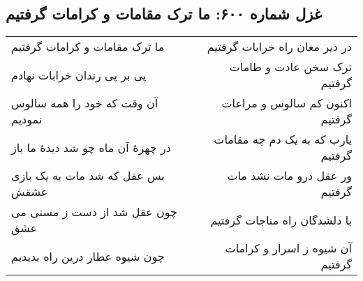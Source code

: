 \begin{center}
\section*{غزل شماره ۶۰۰: ما ترک مقامات و کرامات گرفتیم}
\label{sec:600}
\begin{longtable}{l p{0.5cm} r}
ما ترک مقامات و کرامات گرفتیم
&&
در دیر مغان راه خرابات گرفتیم
\\
پی بر پی رندان خرابات نهادم
&&
ترک سخن عادت و طامات گرفتیم
\\
آن وقت که خود را همه سالوس نمودیم
&&
اکنون کم سالوس و مراعات گرفتیم
\\
در چهرهٔ آن ماه چو شد دیدهٔ ما باز
&&
یارب که به یک دم چه مقامات گرفتیم
\\
بس عقل که شد مات به یک بازی عشقش
&&
ور عقل درو مات نشد مات گرفتیم
\\
چون عقل شد از دست ز مستی می عشق
&&
با دلشدگان راه مناجات گرفتیم
\\
چون شیوه عطار درین راه بدیدیم
&&
آن شیوه ز اسرار و کرامات گرفتیم
\\
\end{longtable}
\end{center}
